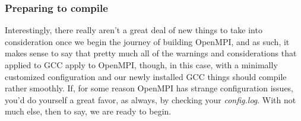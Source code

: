 \documentclass[]{article}
\begin{document}
                 \subsubsection{Preparing to compile}
                 Interestingly, there really aren't a great deal of new things to take into consideration once we begin the journey of building OpenMPI,
                 and as such, it makes sense to say that pretty much all of the warnings and considerations that applied to GCC apply to OpenMPI, though,
                 in this case, with a minimally customized configuration and our newly installed GCC things should compile rather smoothly. If, for some
                 reason OpenMPI has strange configuration issues, you'd do yourself a great favor, as always, by checking your \textit{config.log}. With
                 not much else, then to say, we are ready to begin.
\end{document}
